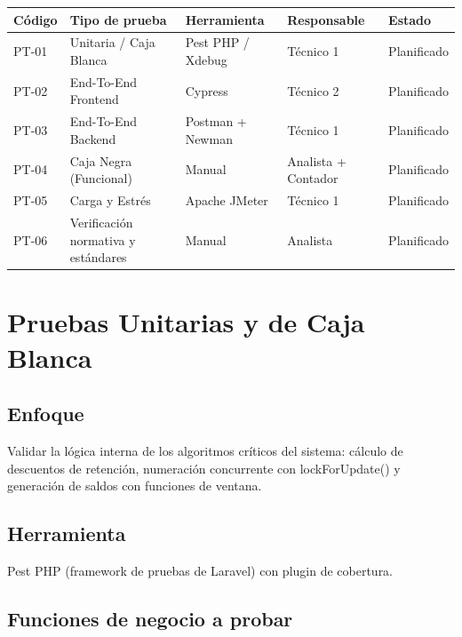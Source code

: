 \documentclass[stu]{apa7}
\begin{document}
\begin{longtable}{|C{1.5cm}|L{3cm}|L{2.5cm}|L{2.5cm}|C{2cm}|}
\hline
{}
\textbf{Código} & \textbf{Tipo de prueba} & \textbf{Herramienta} & \textbf{Responsable} & \textbf{Estado} \\
\hline
PT-01 & Unitaria / Caja Blanca & Pest PHP / Xdebug & Técnico 1 & Planificado \\
\hline
PT-02 & End-To-End Frontend & Cypress & Técnico 2 & Planificado \\
\hline
PT-03 & End-To-End Backend & Postman + Newman & Técnico 1 & Planificado \\
\hline
PT-04 & Caja Negra (Funcional) & Manual & Analista + Contador & Planificado \\
\hline
PT-05 & Carga y Estrés & Apache JMeter & Técnico 1 & Planificado \\
\hline
PT-06 & Verificación normativa y estándares & Manual & Analista & Planificado \\
\hline
\end{longtable}

\section{Pruebas Unitarias y de Caja Blanca}

\subsection{Enfoque}

Validar la lógica interna de los algoritmos críticos del sistema: cálculo de descuentos de retención, numeración concurrente con lockForUpdate() y generación de saldos con funciones de ventana.

\subsection{Herramienta}

Pest PHP (framework de pruebas de Laravel) con plugin de cobertura.

\subsection{Funciones de negocio a probar}
\end{document}
